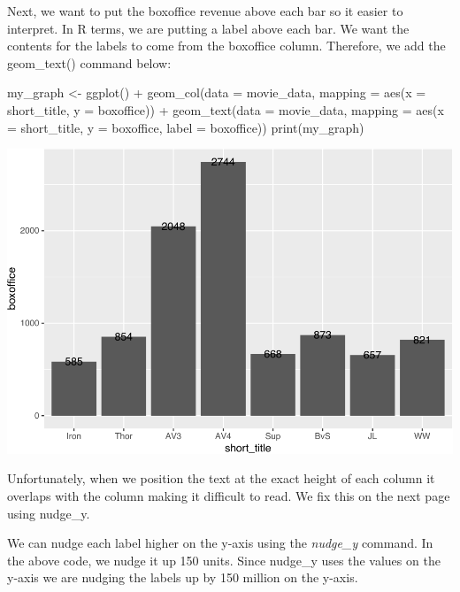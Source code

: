 \documentclass[
]{krantz}
\makeatletter
\newenvironment{Shaded}{\begin{snugshade}}{\end{snugshade}}
\newcommand{\AttributeTok}[1]{\textcolor[rgb]{0.61,0.61,0.61}{#1}}
\newcommand{\FunctionTok}[1]{\textcolor[rgb]{0,0,0}{#1}}
\newcommand{\NormalTok}[1]{#1}
\newcommand{\OtherTok}[1]{\textcolor[rgb]{0.37,0.37,0.37}{#1}}
\newcommand{\SpecialCharTok}[1]{\textcolor[rgb]{0,0,0}{#1}}
\newenvironment{kframe}{%
\medskip{}
\setlength{\fboxsep}{.8em}
 \def\at@end@of@kframe{}%
 \ifinner\ifhmode%
  \def\at@end@of@kframe{\end{minipage}}%
  \begin{minipage}{\columnwidth}%
 \fi\fi%
 \def\FrameCommand##1{\hskip\@totalleftmargin \hskip-\fboxsep
 \colorbox{shadecolor}{##1}\hskip-\fboxsep
     \hskip-\linewidth \hskip-\@totalleftmargin \hskip\columnwidth}%
 \MakeFramed {\advance\hsize-\width
   \@totalleftmargin\z@ \linewidth\hsize
   \@setminipage}}%
 {\par\unskip\endMakeFramed%
 \at@end@of@kframe}
\renewenvironment{Shaded}{\begin{kframe}}{\end{kframe}}
\makeatother
\begin{document}
Next, we want to put the boxoffice revenue above each bar so it easier to interpret. In R terms, we are putting a label above each bar. We want the contents for the labels to come from the boxoffice column. Therefore, we add the geom\_text() command below:

\begin{Shaded}
\begin{Highlighting}[]
\NormalTok{my\_graph }\OtherTok{\textless{}{-}} \FunctionTok{ggplot}\NormalTok{() }\SpecialCharTok{+}
  \FunctionTok{geom\_col}\NormalTok{(}\AttributeTok{data =}\NormalTok{ movie\_data,}
           \AttributeTok{mapping =} \FunctionTok{aes}\NormalTok{(}\AttributeTok{x =}\NormalTok{ short\_title, }
                         \AttributeTok{y =}\NormalTok{ boxoffice)) }\SpecialCharTok{+}
  \FunctionTok{geom\_text}\NormalTok{(}\AttributeTok{data =}\NormalTok{ movie\_data, }
           \AttributeTok{mapping =} \FunctionTok{aes}\NormalTok{(}\AttributeTok{x =}\NormalTok{ short\_title, }
                         \AttributeTok{y =}\NormalTok{ boxoffice, }
                         \AttributeTok{label =}\NormalTok{ boxoffice))}
\FunctionTok{print}\NormalTok{(my\_graph)}
\end{Highlighting}
\end{Shaded}

\includegraphics[width=0.65\linewidth]{bookdown_files/figure-latex/unnamed-chunk-107-1}

Unfortunately, when we position the text at the exact height of each column it overlaps with the column making it difficult to read. We fix this on the next page using nudge\_y.

We can nudge each label higher on the y-axis using the \emph{nudge\_y} command. In the above code, we nudge it up 150 units. Since nudge\_y uses the values on the y-axis we are nudging the labels up by 150 million on the y-axis.
\end{document}
